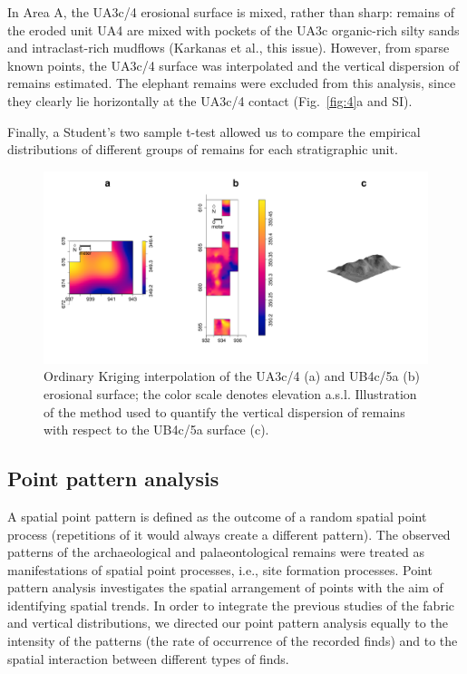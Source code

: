 \documentclass[preprint,authoryear,times]{elsarticle} %
\begin{document}
In Area A, the UA3c/4 erosional surface is mixed, rather than sharp: remains of the eroded unit UA4 are mixed with pockets of the UA3c organic-rich silty sands and intraclast-rich mudflows (Karkanas et al., this issue). However, from sparse known points, the UA3c/4 surface was interpolated and the vertical dispersion of remains estimated. The elephant remains were excluded from this analysis, since they clearly lie horizontally at the UA3c/4 contact (Fig.~\ref{fig:4}a and SI). 

Finally, a Student's two sample t-test allowed us to compare the empirical distributions of different groups of remains for each stratigraphic unit.

\begin{figure}[]
  \centering
  \includegraphics[width=1\textwidth]{../artwork/Fig5.pdf}
  \caption{Ordinary Kriging interpolation of the UA3c/4 (a) and UB4c/5a (b) erosional surface; the color scale denotes elevation a.s.l. Illustration of the method used to quantify the vertical dispersion of remains with respect to the UB4c/5a surface (c).}
  \label{fig:5}
\end{figure}

\subsection{Point pattern analysis}

A spatial point pattern is defined as the outcome of a random spatial point process (repetitions of it would always create a different pattern). The observed patterns of the archaeological and palaeontological remains were treated as manifestations of spatial point processes, i.e., site formation processes. Point pattern analysis investigates the spatial arrangement of points with the aim of identifying spatial trends. In order to integrate the previous studies of the fabric and vertical distributions, we directed our point pattern analysis equally to the intensity of the patterns (the rate of occurrence of the recorded finds) and to the spatial interaction between different types of finds.
\end{document}
